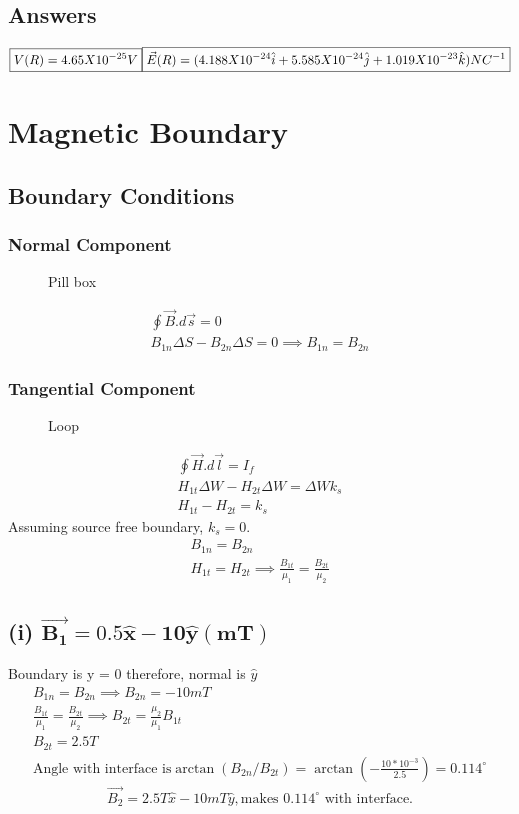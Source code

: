 \documentclass[11pt, a4paper]{article}
\begin{document}
\subsection*{Answers}
\(\boxed{V(R) =4.65 X 10^{-25} V}\\\boxed{\vec{E}(R)=  (4.188X10^{-24}\hat{i}+ 5.585X10^{-24} \hat{j}+1.019 X 10^{-23} \hat{k} )NC^{-1} }\)
\section{Magnetic Boundary}
\subsection*{Boundary Conditions}
\subsubsection*{Normal Component}
\begin{figure}[H]
    \centering
    \caption{Pill box}
    \label{fig:normcom}
\end{figure}
\begin{gather}
    \oint \vec{B}. d\vec{s} = 0 \\
    B_{1n} \Delta S - B_{2n} \Delta S = 0 \implies B_{1n} = B_{2n}
\end{gather}
\subsubsection*{Tangential Component}
\begin{figure}[H]
    \centering
    \caption{Loop}
    \label{fig:magtan}
\end{figure}
\begin{gather}
    \oint \vec{H}.d\vec{l} = I_{f}\\
    H_{1t}\Delta W - H_{2t} \Delta W = \Delta W k_s\\
    H_{1t} - H_{2t}=k_s 
\end{gather}
Assuming source free boundary, $k_s =0$. 
\begin{gather}
    B_{1n} = B_{2n}\\
    H_{1t} = H_{2t}  \implies \frac{B_{1t}}{\mu_1} =  \frac{B_{2t}}{\mu_2} 
\end{gather}
\subsection*{(i) \(\mathbf{\vec{B_1} = 0.5 \hat{x} -10 \hat{y} (mT)}\) }
Boundary is y = 0 therefore, normal is \(\hat{y} \) 
\begin{gather}
    B_{1n} = B_{2n}\implies B_{2n} = -10mT \\
    \frac{B_{1t}}{\mu_1} = \frac{B_{2t}}{\mu_2} \implies  B_{2t} = \frac{\mu_2}{\mu_1}B_{1t}\\
    B_{2t} = 2.5 T\\
    \text{Angle with interface is} \arctan (B_{2n}/B_{2t} ) = \arctan (-\frac{10*10^{-3} }{2.5}) = 0.114^{\circ}
\end{gather}
\begin{equation}
    \boxed{\vec{B_2} = 2.5T\hat{x}  - 10mT \hat{y} , \text{makes } 0.114^{\circ} \text{ with interface.}}
\end{equation}
\end{document}
